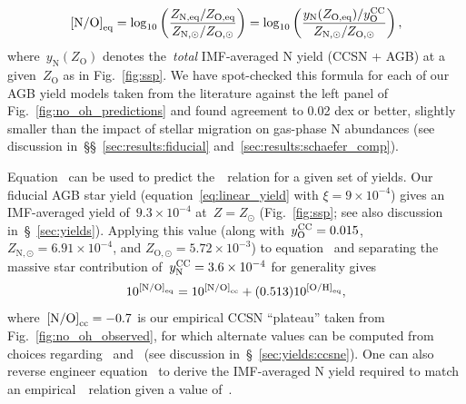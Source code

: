 \documentclass[ms.tex]{subfiles}
\begin{document}
\begin{equation}
\text{[N/O]}_\text{eq} = \log_{10}\left(\frac{
	Z_\text{N,eq} / Z_\text{O,eq}
}{
	Z_{\text{N},\odot} / {Z_{\text{O},\odot}}
}\right) = \log_{10}\left(\frac{
	y_\text{N}(Z_\text{O,eq}) / y_\text{O}^\text{CC}
}{
	Z_{\text{N},\odot} / Z_{\text{O},\odot}
}\right),
\label{eq:noeq}
\end{equation}
where~$y_\text{N}(Z_\text{O})$ denotes the~\textit{total} IMF-averaged N yield
(CCSN + AGB) at a given~$Z_\text{O}$ as in Fig.~\ref{fig:ssp}.
We have spot-checked this formula for each of our AGB yield models taken from
the literature against the left panel of Fig.~\ref{fig:no_oh_predictions} and
found agreement to 0.02 dex or better, slightly smaller than the impact of
stellar migration on gas-phase N abundances (see discussion
in~\S\S~\ref{sec:results:fiducial} and~\ref{sec:results:schaefer_comp}).
\par
Equation~ can be used to predict the~\ohno~relation for a given
set of yields.
Our fiducial AGB star yield (equation~\ref{eq:linear_yield} with
$\xi = 9\times10^{-4}$) gives an IMF-averaged yield of~$9.3\times10^{-4}$ 
at~$Z = Z_\odot$ (Fig.~\ref{fig:ssp}; see also discussion
in~\S~\ref{sec:yields}).
Applying this value (along with~$y_\text{O}^\text{CC} = 0.015$,
$Z_{\text{N},\odot} = 6.91\times10^{-4}$, and
$Z_{\text{O},\odot} = 5.72\times10^{-3}$) to equation~ and
separating the massive star contribution of~$y_\text{N}^\text{CC} = 3.6\times10^{-4}$ for
generality gives
\begin{equation}
10^{\text{[N/O]}_\text{eq}} = 10^{\text{[N/O]}_\text{cc}} + (0.513)10^{\text{[O/H]}_\text{eq}},
\end{equation}
where~$\text{[N/O]}_\text{cc} = -0.7$ is our empirical CCSN ``plateau'' taken from
Fig.~\ref{fig:no_oh_observed}, for which alternate values can be computed from
choices regarding~ and~ (see discussion
in~\S~\ref{sec:yields:ccsne}).
One can also reverse engineer equation~ to derive the IMF-averaged
N yield required to match an empirical~\ohno~relation given a value of~.
\end{document}
